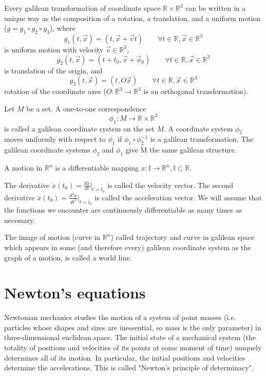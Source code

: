 \documentclass[11pt]{book}
\begin{document}
Every galilean transformation of  coordinate space $\mathbb{R} \times \mathbb{R}^3$
can be written in a unique way as the composition of a rotation, a translation,
and a uniform motion ($g = g_1 \circ g_2 \circ g_3$), where
\[g_1(t,\vec x)=(t,\vec x+\vec v t)\qquad \forall t\in \mathbb{R},\vec x \in\mathbb{R}^3\] is uniform motion with velocity $\vec v \in\mathbb{R}^3$,
\[g_2(t,\vec x)=(t+t_0,\vec x+\vec x_0)\qquad \forall t\in \mathbb{R},\vec x \in\mathbb{R}^3\] is translation of the origin, and
\[g_3(t,\vec x)=(t,O\vec x)\qquad \forall t\in \mathbb{R},\vec x \in\mathbb{R}^3\] rotation of the coordinate axes ($O:\mathbb{R}^3 \rightarrow \mathbb{R}^3$ is an orthogonal transformation).

Let $M$ be a set. A one-to-one correspondence 
\[\phi_1: M \rightarrow \mathbb{R} \times \mathbb{R}^3\]
is called a galilean coordinate system on the set $M$. A coordinate system $\phi_2$ moves
uniformly with respect to $\phi_1$  if $\phi_1\circ\phi_2^{-1}$ is a galilean
transformation. The galilean coordinate systems $\phi_2$ and $\phi_1$ give M the same
galilean structure.

A motion in $\mathbb{R}^n$ is a differentiable mapping 
$x: \mathbb{I}\rightarrow \mathbb{R}^n, \mathbb{I} \subset \mathbb{R}$.

The derivative $\dot{x}(t_0)=\frac{dx}{dt}|_{t=t_0}$ is called the velocity vector. 
The second derivative $\ddot{x}(t_0)=\frac{d^2x}{dt^2}|_{t=t_0}$ is called the acceleration vector.
We will assume that the functions we encounter are continuously 
differentiable as many times as necessary.

The image of motion (curve in $\mathbb{R}^n$) called trajectory and  curve in galilean space which appears in some (and therefore every) galilean coordinate system as the graph of a motion, is called a world line.
\section{Newton's equations}
\label{newton-eqs}
Newtonian mechanics studies the motion of a system of point masses (i.e. particles whose
shapes and sizes are inessential, so mass is the only parameter) in three-dimensional euclidean space. 
The initial state of a mechanical system (the totality of positions and
velocities of its points at some moment of time) uniquely determines all of
its motion. In particular, the initial positions and velocities determine the accelerations.
This is called "Newton's principle of determinacy".
\end{document}
